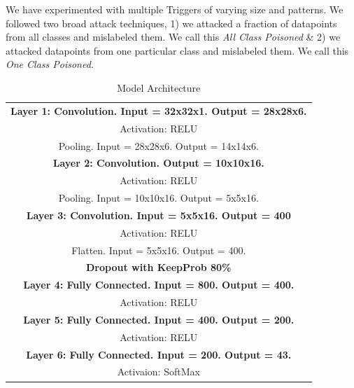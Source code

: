 \documentclass{article}
\begin{document}
We have experimented with multiple Triggers of varying size and patterns. We followed two broad attack techniques, 1) we attacked a fraction of datapoints from all classes and mislabeled them. We call this \emph{All Class Poisoned} \& 2) we attacked datapoints from one particular class and mislabeled them. We call this \emph{One Class Poisoned.}
\begin{table}[h]
  \centering
  \caption{Model Architecture}
    \begin{tabular}{|c|}
    
    \textbf{ Layer 1: Convolution. Input = 32x32x1. Output = 28x28x6.} \\
    
     Activation: RELU \\
    
     Pooling. Input = 28x28x6. Output = 14x14x6. \\
    
    \textbf{ Layer 2: Convolution. Output = 10x10x16.} \\
    
     Activation: RELU \\
    
     Pooling. Input = 10x10x16. Output = 5x5x16. \\
    
    \textbf{ Layer 3: Convolution. Input = 5x5x16. Output = 400} \\
    
     Activation: RELU \\
    
     Flatten. Input = 5x5x16. Output = 400. \\
    
    \textbf{ Dropout with KeepProb 80\%} \\
    
    \textbf{ Layer 4: Fully Connected. Input = 800. Output = 400.} \\
    
     Activation: RELU \\
    
    \textbf{ Layer 5: Fully Connected. Input = 400. Output = 200.} \\
    
     Activation: RELU \\
    
    \textbf{ Layer 6: Fully Connected. Input = 200. Output = 43.} \\
    
    Activaion: SoftMax \\
    
    \end{tabular}%
  \label{tab:Arch}%
\end{table}%
\end{document}
